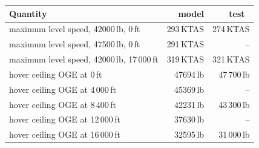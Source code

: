\begin{tabular}{@{}lrr@{}}
\toprule
Quantity & model & test~\cite{rc} \\
\midrule
maximum level speed, 42000\,lb, 0\,ft & 293\,KTAS & 274\,KTAS \\
maximum level speed, 47500\,lb, 0\,ft & 291\,KTAS & -- \\
maximum level speed, 42000\,lb, 17\,000\,ft & 319\,KTAS & 321\,KTAS \\
hover ceiling OGE at 0\,ft & 47694\,lb & 47\,700\,lb \\
hover ceiling OGE at 4\,000\,ft & 45369\,lb & -- \\
hover ceiling OGE at 8\,400\,ft & 42231\,lb & 43\,300\,lb \\
hover ceiling OGE at 12\,000\,ft & 37630\,lb & -- \\
hover ceiling OGE at 16\,000\,ft & 32595\,lb & 31\,000\,lb \\
\bottomrule
\end{tabular}
